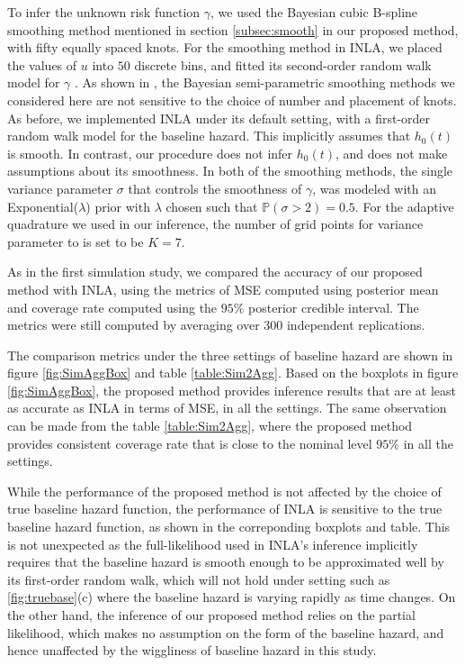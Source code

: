 \documentclass[ba]{imsart}
\begin{document}
To infer the unknown risk function $\gamma$, we used the Bayesian cubic B-spline smoothing method mentioned in section \ref{subsec:smooth} in our proposed method, with fifty equally spaced knots. For the smoothing method in INLA, we placed the values of $u$ into $50$ discrete bins, and fitted its second-order random walk model for $\gamma$ \citep{rw2}. As shown in \cite{casecross}, the Bayesian semi-parametric smoothing methods we considered here are not sensitive to the choice of number and placement of knots. 
As before, we implemented INLA under its default setting, with a first-order random walk model for the baseline hazard. This implicitly assumes that $h_{0}(t)$ is smooth. In contrast, our procedure does not infer $h_{0}(t)$, and does not make assumptions about its smoothness. In both of the smoothing methods, the single variance parameter $\sigma$ that controls the smoothness of $\gamma$, was modeled with an Exponential($\lambda$) prior with $\lambda$ chosen such that $\mathbb{P}\left( \sigma > 2\right) = 0.5$. For the adaptive quadrature we used in our inference, the number of grid points for variance parameter to is set to be $K = 7$.




As in the first simulation study, we compared the accuracy of our proposed method with INLA, using the metrics of MSE computed using posterior mean and coverage rate computed using the $95\%$ posterior credible interval. The metrics were still computed by averaging over 300 independent replications.



The comparison metrics under the three settings of baseline hazard are shown in figure \ref{fig:SimAggBox} and table \ref{table:Sim2Agg}. Based on the boxplots in figure \ref{fig:SimAggBox}, the proposed method provides inference results that are at least as accurate as INLA in terms of MSE, in all the settings. The same observation can be made from the table \ref{table:Sim2Agg}, where the proposed method provides consistent coverage rate that is close to the nominal level $95\%$ in all the settings. 

While the performance of the proposed method is not affected by the choice of true baseline hazard function, the performance of INLA is sensitive to the true baseline hazard function, as shown in the correponding boxplots and table. This is not unexpected as the full-likelihood used in INLA's inference implicitly requires that the baseline hazard is smooth enough to be approximated well by its first-order random walk, which will not hold under setting such as \ref{fig:truebase}(c) where the baseline hazard is varying rapidly as time changes. On the other hand, the inference of our proposed method relies on the partial likelihood, which makes no assumption on the form of the baseline hazard, and hence unaffected by the wiggliness of baseline hazard in this study. 
\end{document}
